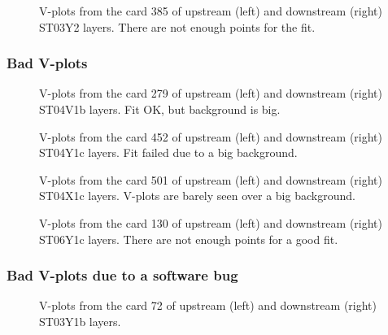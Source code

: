 \documentclass[a4paper,12pt]{article}
\begin{document}
\begin{figure}[ht]
\centering
\caption{V-plots from the card 385 of upstream (left) and downstream (right) ST03Y2 layers.
There are not enough points for the fit.}
\label{fig:Vs_ST03Y2a_card385}
\epsfxsize=255pt 
\end{figure}

\clearpage
\subsubsection{Bad V-plots}
\begin{figure}[ht]
\centering
\caption{V-plots from the card 279 of upstream (left) and downstream (right) ST04V1b layers.
Fit OK, but background is big.}
\label{fig:Vs_ST04V1b_card279}
\epsfxsize=255pt 
\end{figure}

\begin{figure}[ht]
\centering
\caption{V-plots from the card 452 of upstream (left) and downstream (right) ST04Y1c layers.
Fit failed due to a big background.}
\label{fig:Vs_ST04Y1c_card452}
\epsfxsize=255pt 
\end{figure}

\begin{figure}[ht]
\centering
\caption{V-plots from the card 501 of upstream (left) and downstream (right) ST04X1c layers.
V-plots are barely seen over a big background.}
\label{fig:Vs_ST04X1c_card501}
\epsfxsize=255pt 
\end{figure}

\begin{figure}[ht]
\centering
\caption{V-plots from the card 130 of upstream (left) and downstream (right) ST06Y1c layers.
There are not enough points for a good fit.}
\label{fig:Vs_ST06Y1c_card130}
\epsfxsize=255pt 
\end{figure}

\clearpage
\subsubsection{Bad V-plots due to a software bug}

\begin{figure}[ht]
\centering
\caption{V-plots from the card 72 of upstream (left) and downstream (right) ST03Y1b layers.}
\label{fig:Vs_ST03Y1b_card72}
\epsfxsize=255pt 
\end{figure}
\end{document}
